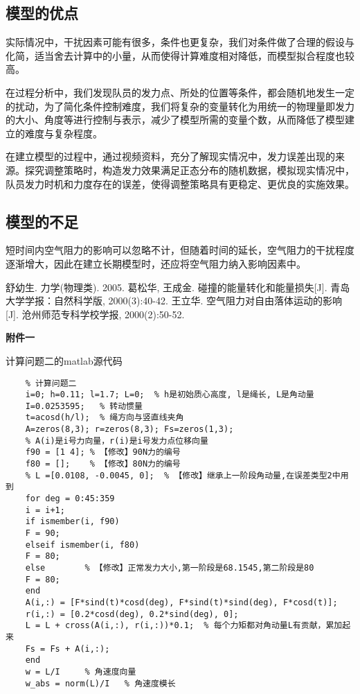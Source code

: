 \documentclass[withoutpreface,bwprint]{cumcmthesis} %
\begin{document}
\subsection{模型的优点}
实际情况中，干扰因素可能有很多，条件也更复杂，我们对条件做了合理的假设与化简，适当舍去计算中的小量，从而使得计算难度相对降低，而模型拟合程度也较高。

在过程分析中，我们发现队员的发力点、所处的位置等条件，都会随机地发生一定的扰动，为了简化条件控制难度，我们将复杂的变量转化为用统一的物理量即发力的大小、角度等进行控制与表示，减少了模型所需的变量个数，从而降低了模型建立的难度与复杂程度。

在建立模型的过程中，通过视频资料，充分了解现实情况中，发力误差出现的来源。探究调整策略时，构造发力效果满足正态分布的随机数据，模拟现实情况中，队员发力时机和力度存在的误差，使得调整策略具有更稳定、更优良的实施效果。
\subsection{模型的不足}
短时间内空气阻力的影响可以忽略不计，但随着时间的延长，空气阻力的干扰程度逐渐增大，因此在建立长期模型时，还应将空气阻力纳入影响因素中。
\newpage

\begin{thebibliography}{9}%
    舒幼生. 力学(物理类). 2005.
     葛松华, 王成金. 碰撞的能量转化和能量损失[J]. 青岛大学学报：自然科学版, 2000(3):40-42.
    王立华. 空气阻力对自由落体运动的影响[J]. 沧州师范专科学校学报, 2000(2):50-52.
\end{thebibliography}


\newpage
\textbf{{\Large 附件一}}

计算问题二的matlab源代码

\begin{lstlisting}
	% 计算问题二
	i=0; h=0.11; l=1.7; L=0;  % h是初始质心高度, l是绳长, L是角动量
	I=0.0253595;   % 转动惯量
	t=acosd(h/l);  % 绳方向与竖直线夹角
	A=zeros(8,3); r=zeros(8,3); Fs=zeros(1,3);
	% A(i)是i号力向量，r(i)是i号发力点位移向量
	f90 = [1 4]; % 【修改】90N力的编号
	f80 = [];    % 【修改】80N力的编号
	% L =[0.0108, -0.0045, 0];  % 【修改】继承上一阶段角动量,在误差类型2中用到
	for deg = 0:45:359
	i = i+1;
	if ismember(i, f90) 
	F = 90;
	elseif ismember(i, f80)
	F = 80;
	else        % 【修改】正常发力大小,第一阶段是68.1545,第二阶段是80
	F = 80;
	end
	A(i,:) = [F*sind(t)*cosd(deg), F*sind(t)*sind(deg), F*cosd(t)];
	r(i,:) = [0.2*cosd(deg), 0.2*sind(deg), 0];
	L = L + cross(A(i,:), r(i,:))*0.1;  % 每个力矩都对角动量L有贡献，累加起来
	Fs = Fs + A(i,:);
	end
	w = L/I     % 角速度向量
	w_abs = norm(L)/I   % 角速度模长
\end{lstlisting}
\end{document}
